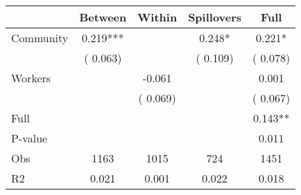 
\begin{tabular}{l*{4}{c}}\hline&\multicolumn{1}{c}{Between}&\multicolumn{1}{c}{Within}&\multicolumn{1}{c}{Spillovers}&\multicolumn{1}{c}{Full}\\ \hline
 Community             &              0.219***      &                                               &        0.248* &         0.221*                            \\ 
                               &        (       0.063)           &                                       &       (       0.109)     &      (       0.078)                                           \\ 
 Workers       &                                               &       -0.061    &                                &             0.001                            \\ 
                               &                                               & (       0.069)                  &                                        &      (       0.067)                                           \\ 
\hline                                                                                                                                                                                                                                            
 Full                  &                                               &                                               &                                        &             0.143**                                     \\ 
 P-value               &                                               &                                               &                                        &             0.011                                           \\ 
 Obs                   &               1163               &       1015                       &       724                &              1451                                               \\ 
 R2                    &                      0.021              &              0.001                      &              0.022               &                     0.018                                              \\ 
\hline \end{tabular}                                                                                                                                                                                                              